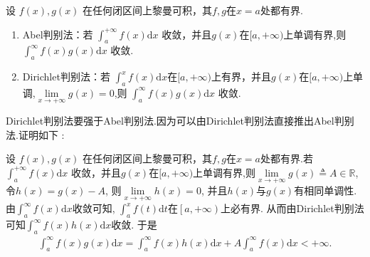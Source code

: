 \documentclass[../../main.tex]{subfiles}%
\begin{document}
\begin{theorem}[A-D判别法]\label{theorem:A-D判别法}
设 \(f(x),g(x)\) 在任何闭区间上黎曼可积，其$f,g$在$x=a$处都有界.
\begin{enumerate}
\item {\heiti Abel判别法}：若 \(\int_{a}^{+\infty} f(x) \mathrm{d}x\) 收敛，并且$g(x)$在$[a,+\infty)$上单调有界,则 \(\int_{a}^{\infty} f(x)g(x) \mathrm{d}x\) 收敛.

\item {\heiti Dirichlet判别法}：若 \(\int_{a}^{x} f(x) \mathrm{d}x\)在$[a,+\infty)$上有界，并且\(g(x)\)在\([a,+\infty)\)上单调,$\underset{x\rightarrow +\infty}{\lim}g\left( x \right) =0$,则 \(\int_{a}^{\infty} f(x)g(x) \mathrm{d}x\) 收敛.
\end{enumerate}
\end{theorem}
\begin{remark}
Dirichlet判别法要强于Abel判别法.因为可以由Dirichlet判别法直接推出Abel判别法.证明如下 :

设 \(f(x),g(x)\) 在任何闭区间上黎曼可积，其$f,g$在$x=a$处都有界.若 \(\int_{a}^{+\infty} f(x) \mathrm{d}x\) 收敛，并且$g(x)$在$[a,+\infty)$上单调有界,则$\lim\limits_{x\rightarrow +\infty}g\left( x \right) \triangleq A\in \mathbb{R} $, 令$h\left( x \right) =g\left( x \right) -A$, 则$\lim\limits_{x\rightarrow +\infty}h\left( x \right) =0$, 并且$h\left( x \right) $与$g\left( x \right) $有相同单调性. 由$\int_a^{\infty}{f\left( x \right)}\mathrm{d}x$收敛可知, $\int_a^x{f\left( t \right)}\mathrm{d}t$在$\left[ a,+\infty \right) $上必有界. 从而由Dirichlet判别法可知$\int_a^{\infty}{f\left( x \right) h\left( x \right)}\mathrm{d}x$收敛. 于是
\begin{align*}
\int_a^{\infty}{f\left( x \right) g\left( x \right)}\mathrm{d}x=\int_a^{\infty}{f\left( x \right) h\left( x \right)}\mathrm{d}x+A\int_a^{\infty}{f\left( x \right)}\mathrm{d}x<+\infty .
\end{align*}
\end{remark}
\end{document}
